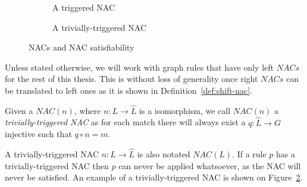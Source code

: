 \begin{example}
\begin{figure}[!ht]
\begin{subfigure}[t]{.5\textwidth}
    \caption{A triggered NAC}\label{fig:gts:nacs:triggered}
  \end{subfigure}
  \begin{subfigure}[t]{.5\textwidth}
    \centerline{}
    \caption{A trivially-triggered NAC}\label{fig:gts:nacs:trivial}
  \end{subfigure}
  \caption{NACs and NAC satisfiability}\label{fig:gts:nacs}
\end{figure}
\end{example}

\begin{assumption} Unless stated otherwise, we will work with graph rules that have only left $NACs$ for the rest of this thesis. This is without loss of generality once right $NACs$ can be translated to left ones as it is shown in Definition~\ref{def:shift-nac}.
\end{assumption}

\begin{definition}Given a $NAC(n)$, where $n : L \rightarrow \hat{L}$ is a isomorphism, we call $NAC(n)$ a \emph{trivially-triggered NAC} as for each match \match{} there will always exist a $q : \hat{L} \rightarrow G$ injective such that $q \circ n = m$.

  A trivially-triggered NAC $n : L \rightarrow \hat{L}$ is also notated $NAC(L)$. If a rule $p$ has a trivially-triggered NAC then $p$ can never be applied whatsoever, as the NAC will never be satisfied. An example of a trivially-triggered NAC is shown on Figure~\ref{fig:gts:nacs:trivial}.
\end{definition}


